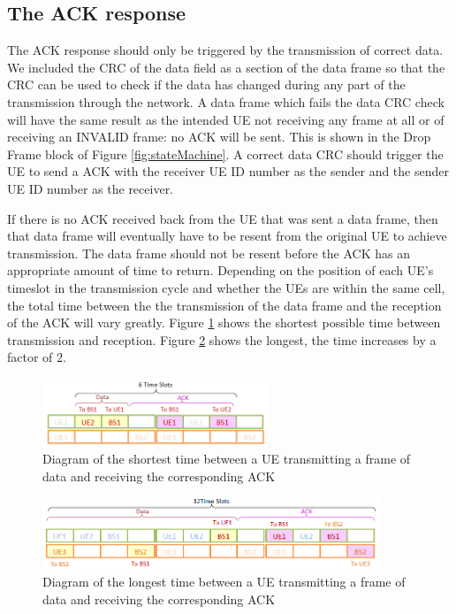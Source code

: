 \subsection {The ACK response }
The ACK response should only be triggered by the transmission of correct data. We included the CRC of the data field as a section of the data frame so that the CRC can be used to check if the data has changed during any part of the transmission through the network. A data frame which fails the data CRC check will have the same result as the intended UE not receiving any frame at all or of receiving an INVALID frame: no ACK will be sent. This is shown in the Drop Frame block of Figure \ref{fig:stateMachine}. A correct data CRC should trigger the UE to send a ACK with the receiver UE ID number as the sender and the sender UE ID number as the receiver. 

If there is no ACK received back from the UE that was sent a data frame, then that data frame will eventually have to be resent from the original UE to achieve transmission. The data frame should not be resent before the ACK has an appropriate amount of time to return. Depending on the position of each UE's timeslot in the transmission cycle and whether the UEs are within the same cell, the total time between the the transmission of the data frame and the reception of the ACK will vary greatly. Figure \ref{fig:ACKtimeshort} shows the shortest possible time between transmission and reception. Figure \ref{fig:ACKtimelong} shows the longest, the time increases by a factor of 2. 

\begin{figure}[ht]
    \centering
    \includegraphics[width=0.6\textwidth]{ACK_timeout_short.PNG}
    \caption{Diagram of the shortest time between a UE transmitting a frame of data and receiving the corresponding ACK}
    \label{fig:ACKtimeshort}
\end{figure}

\begin{figure}[ht]
    \centering
    \includegraphics[width=0.9\textwidth]{ACK_timeout_long.PNG}
    \caption{Diagram of the longest time between a UE transmitting a frame of data and receiving the corresponding ACK}
    \label{fig:ACKtimelong}
\end{figure}

